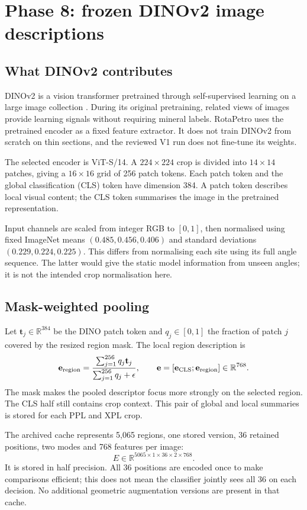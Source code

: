 \section{Phase 8: frozen DINOv2 image descriptions}
\subsection{What DINOv2 contributes}
DINOv2 is a vision transformer pretrained through self-supervised learning on a large image collection \cite{dinov2}. During its original pretraining, related views of images provide learning signals without requiring mineral labels. RotaPetro uses the pretrained encoder as a fixed feature extractor. It does not train DINOv2 from scratch on thin sections, and the reviewed V1 run does not fine-tune its weights.

The selected encoder is ViT-S/14. A $224\times224$ crop is divided into $14\times14$ patches, giving a $16\times16$ grid of 256 patch tokens. Each patch token and the global classification (CLS) token have dimension 384. A patch token describes local visual content; the CLS token summarises the image in the pretrained representation.

Input channels are scaled from integer RGB to $[0,1]$, then normalised using fixed ImageNet means $(0.485,0.456,0.406)$ and standard deviations $(0.229,0.224,0.225)$. This differs from normalising each site using its full angle sequence. The latter would give the static model information from unseen angles; it is not the intended crop normalisation here.

\subsection{Mask-weighted pooling}
Let $\mathbf t_j\in\mathbb R^{384}$ be the DINO patch token and $q_j\in[0,1]$ the fraction of patch $j$ covered by the resized region mask. The local region description is
\begin{equation}
\mathbf e_{\rm region}=\frac{\sum_{j=1}^{256}q_j\mathbf t_j}{\sum_{j=1}^{256}q_j+\epsilon},\qquad
\mathbf e=[\mathbf e_{\rm CLS};\mathbf e_{\rm region}]\in\mathbb R^{768}.
\end{equation}
The mask makes the pooled descriptor focus more strongly on the selected region. The CLS half still contains crop context. This pair of global and local summaries is stored for each PPL and XPL crop.

The archived cache represents 5,065 regions, one stored version, 36 retained positions, two modes and 768 features per image:
\begin{equation}
E\in\mathbb R^{5065\times1\times36\times2\times768}.
\end{equation}
It is stored in half precision. All 36 positions are encoded once to make comparisons efficient; this does not mean the classifier jointly sees all 36 on each decision. No additional geometric augmentation versions are present in that cache.

